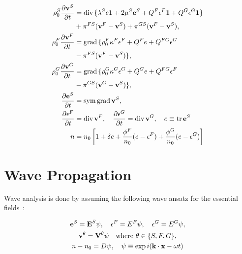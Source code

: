 \documentclass[twocolumn]{article}
\begin{document}
\begin{align*}
    \rho_0^S\frac{\partial\textbf{v}^S}{\partial{t}} & = \textrm{div\,}\{\lambda^Se\textbf{1} + 2\mu^S\textbf{e}^S + Q^F\epsilon^F\textbf{1} + Q^G\epsilon^G\textbf{1}\} \\&+\pi^{FS}(\textbf{v}^F - \textbf{v}^S) + \pi^{GS}(\textbf{v}^F - \textbf{v}^S),\\
    \rho_0^F\frac{\partial\textbf{v}^F}{\partial{t}} & = \textrm{grad\,}\{\rho_0^F\kappa^F\epsilon^F + Q^Fe + Q^{FG}\epsilon^G                                           \\&- \pi^{FS}(\textbf{v}^F - \textbf{v}^S)\},\\
    \rho_0^G\frac{\partial\textbf{v}^G}{\partial{t}} & = \textrm{grad\,}\{\rho_0^G\kappa^G\epsilon^G + Q^Ge + Q^{FG}\epsilon^F                                           \\&- \pi^{GS}(\textbf{v}^G - \textbf{v}^S)\},\\
    \frac{\partial\textbf{e}^S}{\partial{t}}         & = \textrm{sym\,grad\,}\textbf{v}^S,                                                                               \\
    \frac{\partial\epsilon^F}{\partial{t}}           & = \textrm{div\,}\textbf{v}^F, \quad
    \frac{\partial\epsilon^G}{\partial{t}} = \textrm{div\,}\textbf{v}^G, \quad
    e \equiv \textrm{tr\,}\textbf{e}^S                                                                                                                                   \\
    n                                                & = n_0\left[1 + \delta{e} + \frac{\phi^F}{n_0}(e - \epsilon^F) + \frac{\phi^G}{n_0}(e - \epsilon^G)\right]
\end{align*}

\section{Wave Propagation}
Wave analysis is done by assuming the following wave ansatz for the essential fields~\cite{detmann_analysis_2009}:

\begin{gather*}
    \textbf{e}^S = \textbf{E}^S\psi, \quad \epsilon^F = E^F\psi, \quad \epsilon^G = E^G\psi,\\
    \textbf{v}^\theta = \textbf{V}^\theta\psi \quad \text{where $\theta \in \{S, F, G\}$},\\
    n - n_0 = D\psi, \quad \psi \equiv \textrm{exp\,}i(\textbf{k}\cdot\textbf{x} - \omega{t})
\end{gather*}
\end{document}
